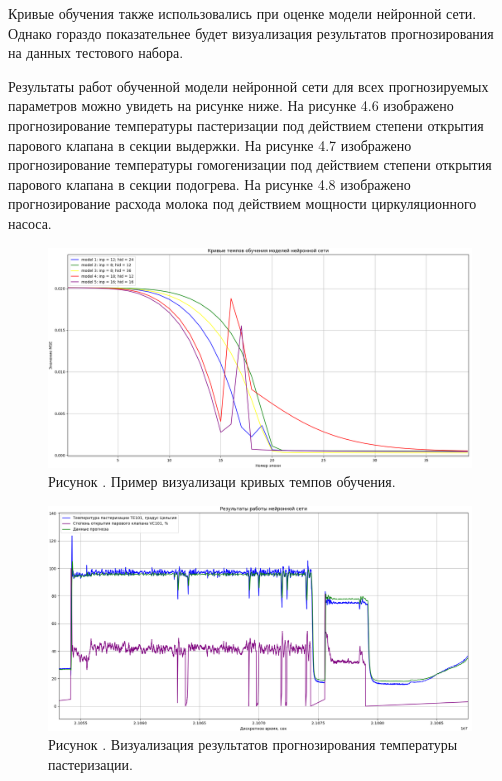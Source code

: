 {  \par \redline Кривые обучения также использовались при оценке модели нейронной сети. Однако гораздо показательнее будет визуализация результатов прогнозирования на данных тестового набора.

  \par \redline Результаты работ обученной модели нейронной сети для всех прогнозируемых параметров можно увидеть на рисунке ниже. На рисунке 4.6 изображено прогнозирование температуры пастеризации под действием степени открытия парового клапана в секции выдержки. На рисунке 4.7 изображено прогнозирование температуры гомогенизации под действием степени открытия парового клапана в секции подогрева. На рисунке 4.8 изображено прогнозирование расхода молока под действием мощности циркуляционного насоса.  

  \begin{figure}
    \centering
    \def\svgwidth{\textwidth}
    \includegraphics[width=\textheight]{images/CTL.png}
    \caption*{\gostFont Рисунок \thechaptercntr .\theimagecntr \spc {--} Пример визуализаци кривых темпов обучения.}
    \label{fig:CTL}
  \end{figure} \addtocounter{imagecntr}{1}

  \begin{figure}
    \centering
    \def\svgwidth{\textwidth}
    \includegraphics[width=\textheight]{images/TE101test.png}
    \caption*{\gostFont Рисунок \thechaptercntr .\theimagecntr \spc {--} Визуализация результатов прогнозирования температуры пастеризации.}
    \label{fig:TE101VisualPredict}
  \end{figure} \addtocounter{imagecntr}{1}

}
